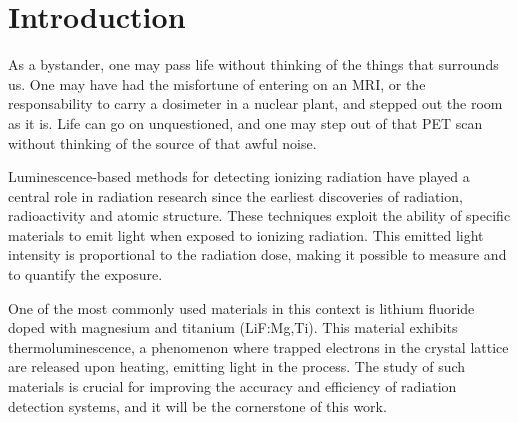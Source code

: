\chapter{Introduction}



As a bystander, one may pass life without thinking of the things that surrounds us. One may have had the misfortune of entering on an MRI, or the responsability to carry a dosimeter in a nuclear plant, and stepped out the room as it is. Life can go on unquestioned, and one may step out of that PET scan without thinking of the source of that awful noise. 

Luminescence-based methods for detecting ionizing radiation have played a central role in radiation research since the earliest discoveries of radiation, radioactivity and atomic structure. 
These techniques exploit the ability of specific materials to emit light when exposed to ionizing radiation. This emitted light intensity is proportional to the radiation dose, making it possible to measure and to quantify the exposure.

One of the most commonly used materials in this context is lithium fluoride doped with magnesium and titanium (LiF:Mg,Ti). This material exhibits thermoluminescence, a phenomenon where trapped electrons in the crystal lattice are released upon heating, emitting light in the process. The study of such materials is crucial for improving the accuracy and efficiency of radiation detection systems, and it will be the cornerstone of this work. 

